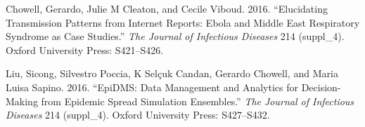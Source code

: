 \documentclass[]{article}
\begin{document}
\hypertarget{refs}{}
\hypertarget{ref-chowell2016elucidating}{}
Chowell, Gerardo, Julie M Cleaton, and Cecile Viboud. 2016.
``Elucidating Transmission Patterns from Internet Reports: Ebola and
Middle East Respiratory Syndrome as Case Studies.'' \emph{The Journal of
Infectious Diseases} 214 (suppl\_4). Oxford University Press:
S421--S426.

\hypertarget{ref-liu2016epidms}{}
Liu, Sicong, Silvestro Poccia, K Selçuk Candan, Gerardo Chowell, and
Maria Luisa Sapino. 2016. ``EpiDMS: Data Management and Analytics for
Decision-Making from Epidemic Spread Simulation Ensembles.'' \emph{The
Journal of Infectious Diseases} 214 (suppl\_4). Oxford University Press:
S427--S432.
\end{document}
